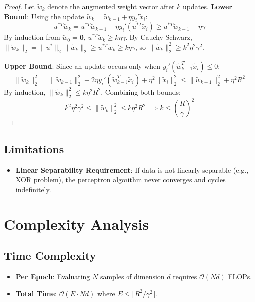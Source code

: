 \documentclass[11pt,a4paper]{article}
\theoremstyle{definition}
\begin{document}
\begin{proof}
Let $\tilde{w}_k$ denote the augmented weight vector after $k$ updates.
\textbf{Lower Bound}: Using the update $\tilde{w}_k = \tilde{w}_{k-1} + \eta y_i' \tilde{x}_i$:
\begin{equation}
u^{*T} \tilde{w}_k = u^{*T} \tilde{w}_{k-1} + \eta y_i' (u^{*T} \tilde{x}_i) \ge u^{*T} \tilde{w}_{k-1} + \eta \gamma
\end{equation}
By induction from $\tilde{w}_0 = \mathbf{0}$, $u^{*T} \tilde{w}_k \ge k \eta \gamma$. By Cauchy-Schwarz, $\|\tilde{w}_k\|_2 = \|u^*\|_2 \|\tilde{w}_k\|_2 \ge u^{*T} \tilde{w}_k \ge k \eta \gamma$, so $\|\tilde{w}_k\|_2^2 \ge k^2 \eta^2 \gamma^2$.

\textbf{Upper Bound}: Since an update occurs only when $y_i' (\tilde{w}_{k-1}^T \tilde{x}_i) \le 0$:
\begin{equation}
\|\tilde{w}_k\|_2^2 = \|\tilde{w}_{k-1}\|_2^2 + 2 \eta y_i' (\tilde{w}_{k-1}^T \tilde{x}_i) + \eta^2 \|\tilde{x}_i\|_2^2 \le \|\tilde{w}_{k-1}\|_2^2 + \eta^2 R^2
\end{equation}
By induction, $\|\tilde{w}_k\|_2^2 \le k \eta^2 R^2$. Combining both bounds:
\begin{equation}
k^2 \eta^2 \gamma^2 \le \|\tilde{w}_k\|_2^2 \le k \eta^2 R^2 \implies k \le \left(\frac{R}{\gamma}\right)^2
\end{equation}
\end{proof}

\subsection{Limitations}
\begin{itemize}
    \item \textbf{Linear Separability Requirement}: If data is not linearly separable (e.g., XOR problem), the perceptron algorithm never converges and cycles indefinitely.
\end{itemize}

\section{Complexity Analysis}

\subsection{Time Complexity}
\begin{itemize}
    \item \textbf{Per Epoch}: Evaluating $N$ samples of dimension $d$ requires $\mathcal{O}(Nd)$ FLOPs.
    \item \textbf{Total Time}: $\mathcal{O}(E \cdot N d)$ where $E \le \lceil R^2 / \gamma^2 \rceil$.
\end{itemize}
\end{document}
